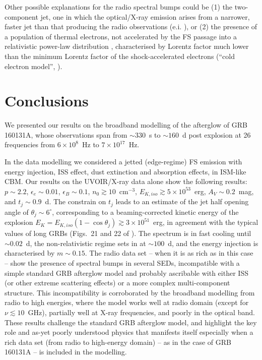 \documentclass{aa}
\begin{document}
Other possible explanations for the radio spectral bumps could be (1) the two-component jet, one in which the optical/X-ray emission arises from a narrower, faster jet than that producing the radio observations (e.i. \citealt{Peng05,Racusin08,Holland12}), or (2) the presence of a population of thermal electrons, not accelerated by the FS passage into a relativistic power-law distribution \citep{Eichler05}, characterised by Lorentz factor much lower than the minimum Lorentz factor of the shock-accelerated electrons (``cold electron model'', \citealt{Ressler17}).


\section{Conclusions}
\label{cap_GRB160131A:concls}

We presented our results on the broadband modelling of the afterglow of GRB\,160131A, whose observations span from $\sim 330$~s to $\sim 160$~d post explosion at 26 frequencies from $6 \times 10^8$~Hz to $7 \times 10^{17}$~Hz.

In the data modelling we considered a jetted (edge-regime) FS emission with energy injection, ISS effect, dust extinction and absorption effects, in ISM-like CBM.
Our results on the UVOIR/X-ray data alone show the following results: $p \sim 2.2$, $\epsilon_e \sim 0.01$, $\epsilon_B \sim 0.1$, $n_0 \gtrsim 10$~cm$^{-3}$, $E_{K,iso} \gtrsim 5 \times 10^{53}$~erg, $A_V \sim 0.2$~mag, and $t_j \sim 0.9$~d.
The constrain on $t_j$ leads to an estimate of the jet half opening angle of $\theta_j \sim 6^{\circ}$, corresponding to a beaming-corrected kinetic energy of the explosion $E_K = E_{K,iso} (1 - \cos{\theta_j}) \gtrsim 3 \times 10^{51}$~erg, in agreement with the typical values of long GRBs (Figs.~21 and 22 of \citealt{Laskar15}).
The spectrum is in fast cooling until $\sim 0.02$~d, the non-relativistic regime sets in at $\sim 100$~d, and the energy injection is characterised by $m \sim 0.15$.
%
The radio data set -- when it is as rich as in this case -- show the presence of spectral bumps in several SEDs, incompatible with a simple standard GRB afterglow model and probably ascribable with either ISS (or other extreme scattering effects) or a more complex multi-component structure.
This incompatibility is corroborated by the broadband modelling from radio to high energies, where the model works well at radio domain (except for $\nu \lesssim 10$~GHz), partially well at X-ray frequencies, and poorly in the optical band.
These results challenge the standard GRB afterglow model, and highlight the key role and as-yet poorly understood physics that manifests itself especially when a rich data set (from radio to high-energy domain) -- as in the case of GRB\,160131A -- is included in the modelling.
\end{document}
